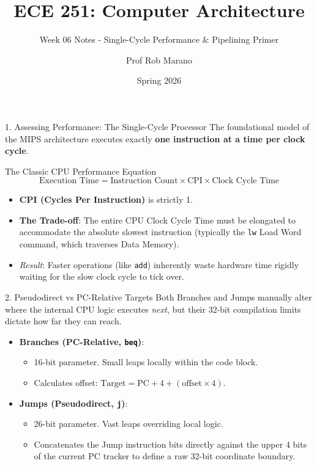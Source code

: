 \documentclass[aspectratio=169]{beamer}
\title{ECE 251: Computer Architecture}
\subtitle{Week 06 Notes - Single-Cycle Performance \& Pipelining Primer}
\author{Prof Rob Marano}
\date{Spring 2026}
\begin{document}
\frame{\titlepage}

\begin{frame}{1. Assessing Performance: The Single-Cycle Processor}
The foundational model of the MIPS architecture executes exactly \textbf{one instruction at a time per clock cycle}.
\vspace{0.2cm}
\begin{block}{The Classic CPU Performance Equation}
$$ \text{Execution Time} = \text{Instruction Count} \times \text{CPI} \times \text{Clock Cycle Time} $$
\end{block}
\vspace{0.2cm}
\begin{itemize}
    \item \textbf{CPI (Cycles Per Instruction)} is strictly 1.
    \item \textbf{The Trade-off}: The entire CPU Clock Cycle Time must be elongated to accommodate the absolute slowest instruction (typically the \texttt{lw} Load Word command, which traverses Data Memory).
    \item \textit{Result}: Faster operations (like \texttt{add}) inherently waste hardware time rigidly waiting for the slow clock cycle to tick over.
\end{itemize}
\end{frame}

\begin{frame}{2. Pseudodirect vs PC-Relative Targets}
Both Branches and Jumps manually alter where the internal CPU logic executes \textit{next}, but their 32-bit compilation limits dictate how far they can reach.
\begin{itemize}
    \item \textbf{Branches (PC-Relative, \texttt{beq})}: 
    \begin{itemize}
        \item 16-bit parameter. Small leaps locally within the code block.
        \item Calculates offset: $\text{Target} = \text{PC} + 4 + (\text{offset} \times 4)$.
    \end{itemize}
    \vspace{0.3cm}
    \item \textbf{Jumps (Pseudodirect, \texttt{j})}:
    \begin{itemize}
        \item 26-bit parameter. Vast leaps overriding local logic.
        \item Concatenates the Jump instruction bits directly against the upper 4 bits of the current PC tracker to define a raw 32-bit coordinate boundary.
    \end{itemize}
\end{itemize}
\end{frame}
\end{document}
